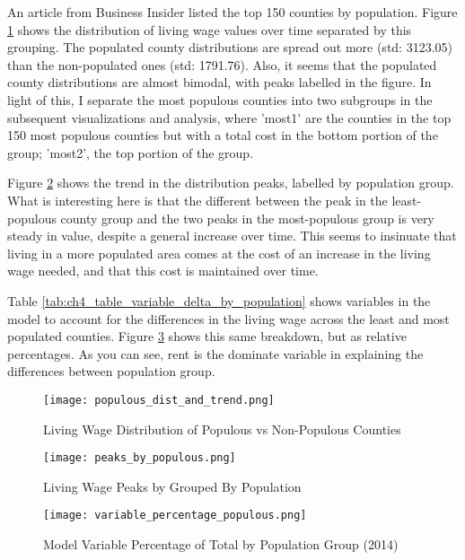 An article from Business Insider \cite{populated_counties} listed the top 150 counties by population. Figure \ref{f:ch4_populous_dist_and_trend} shows the distribution of living wage values over time separated by this grouping. The populated county distributions are spread out more (std: 3123.05) than the non-populated ones (std: 1791.76). Also, it seems that the populated county distributions are almost bimodal, with peaks labelled in the figure. In light of this, I separate the most populous counties into two subgroups in the subsequent visualizations and analysis, where 'most1' are the counties in the top 150 most populous counties but with a total cost in the bottom portion of the group; 'most2', the top portion of the group.

Figure \ref{f:ch4_peaks_by_populous} shows the trend in the distribution peaks, labelled by population group. What is interesting here is that the different between the peak in the least-populous county group and the two peaks in the most-populous group is very steady in value, despite a general increase over time. This seems to insinuate that living in a more populated area comes at the cost of an increase in the living wage needed, and that this cost is maintained over time.

Table \ref{tab:ch4_table_variable_delta_by_population} shows variables in the model to account for the differences in the living wage across the least and most populated counties. Figure \ref{f:ch4_variable_percentage_populous} shows this same breakdown, but as relative percentages. As you can see, rent is the dominate variable in explaining the differences between population group.

\begin{figure}[H]
    \centering
        \texttt{[image: populous\_dist\_and\_trend.png]}
        \caption{Living Wage Distribution of Populous vs Non-Populous Counties}
    \label{f:ch4_populous_dist_and_trend}
\end{figure}

\begin{figure}[H]
    \centering
        \texttt{[image: peaks\_by\_populous.png]}
        \caption{Living Wage Peaks by Grouped By Population}
    \label{f:ch4_peaks_by_populous}
\end{figure}

\begin{figure}[H]
    \centering
        \texttt{[image: variable\_percentage\_populous.png]}
        \caption{Model Variable Percentage of Total by Population Group (2014)}
    \label{f:ch4_variable_percentage_populous}
\end{figure}

